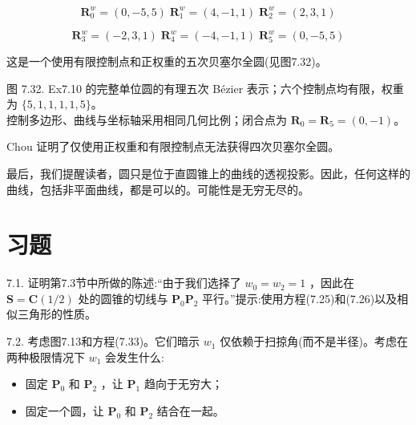 \documentclass[../main.tex]{subfiles}
\begin{document}
\[
{\mathbf{R}}_{0}^{w} = \left( {0, - 5,5}\right) \;{\mathbf{R}}_{1}^{w} = \left( {4, - 1,1}\right) \;{\mathbf{R}}_{2}^{w} = \left( {2,3,1}\right)
\]

\[
{\mathbf{R}}_{3}^{w} = \left( {-2,3,1}\right) \;{\mathbf{R}}_{4}^{w} = \left( {-4, - 1,1}\right) \;{\mathbf{R}}_{5}^{w} = \left( {0, - 5,5}\right)
\]

这是一个使用有限控制点和正权重的五次贝塞尔全圆(见图7.32)。

\begin{center}
\begin{minipage}{37cm}
\vspace*{.6\baselineskip}
\centering
{}
\par\smallskip
图 7.32. Ex7.10 的完整单位圆的有理五次 Bézier 表示；六个控制点均有限，权重为 $\{5,1,1,1,1,5\}$。\\
控制多边形、曲线与坐标轴采用相同几何比例；闭合点为 $\mathbf R_0=\mathbf R_5=(0,-1)$。
\end{minipage}
\end{center}

Chou \cite{Chou95} 证明了仅使用正权重和有限控制点无法获得四次贝塞尔全圆。

最后，我们提醒读者，圆只是位于直圆锥上的曲线的透视投影。因此，任何这样的曲线，包括非平面曲线，都是可以的。可能性是无穷无尽的。

\section*{习题}

7.1. 证明第7.3节中所做的陈述:“由于我们选择了 \({w}_{0} = {w}_{2} = 1\) ，因此在 \(\mathbf{S} = \mathbf{C}\left( {1/2}\right)\) 处的圆锥的切线与 \({\mathbf{P}}_{0}{\mathbf{P}}_{2}\) 平行。”提示:使用方程(7.25)和(7.26)以及相似三角形的性质。

7.2. 考虑图7.13和方程(7.33)。它们暗示 \({w}_{1}\) 仅依赖于扫掠角(而不是半径)。考虑在两种极限情况下 \({w}_{1}\) 会发生什么:

\begin{itemize}
\item 固定 \({\mathbf{P}}_{0}\) 和 \({\mathbf{P}}_{2}\) ，让 \({\mathbf{P}}_{1}\) 趋向于无穷大；
\end{itemize}

\begin{itemize}
\item 固定一个圆，让 \({\mathbf{P}}_{0}\) 和 \({\mathbf{P}}_{2}\) 结合在一起。
\end{itemize}
\end{document}
